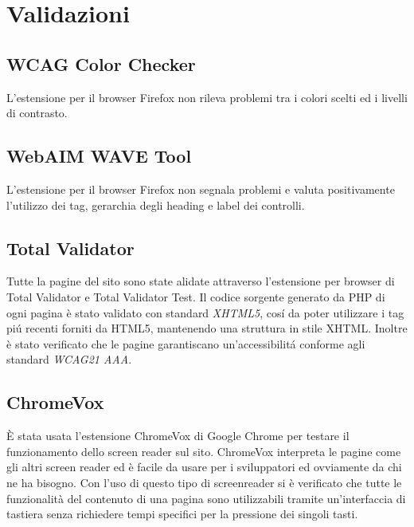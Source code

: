 \section{Validazioni}


\subsection{WCAG Color Checker}
L'estensione per il browser Firefox non rileva problemi tra i colori scelti ed i livelli di contrasto.

\subsection{WebAIM WAVE Tool}
L'estensione per il browser Firefox non segnala problemi e valuta positivamente l'utilizzo dei tag, gerarchia degli heading e label dei controlli.

\subsection{Total Validator}
Tutte la pagine del sito sono state alidate attraverso l'estensione per browser di Total Validator e Total Validator Test. Il codice sorgente generato da PHP di ogni pagina è stato validato con standard \textit{XHTML5}, cosí da poter utilizzare i tag piú recenti forniti da HTML5, mantenendo una struttura in stile XHTML. Inoltre è stato verificato che le pagine garantiscano un'accessibilitá conforme agli standard \textit{WCAG21 AAA}.
\subsection{ChromeVox}
È stata usata l'estensione ChromeVox di Google Chrome per testare il funzionamento dello screen reader sul sito. ChromeVox interpreta le pagine come gli altri screen reader ed è facile da usare per i sviluppatori ed ovviamente da chi ne ha bisogno. Con l'uso di questo tipo di screenreader si è verificato che tutte le funzionalità del contenuto di una pagina sono utilizzabili tramite un'interfaccia di tastiera senza richiedere tempi specifici per la pressione dei singoli tasti.


\vfill
